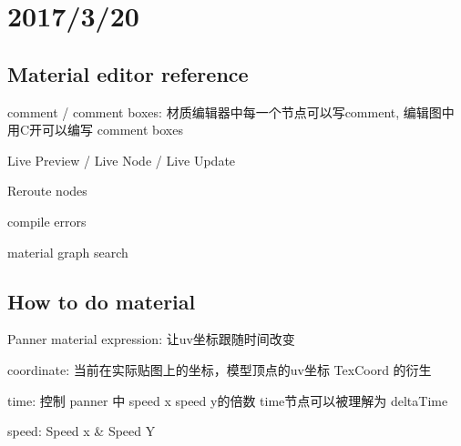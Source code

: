 \documentclass[12pt, a4paper]{article}
\begin{document}
    \section*{2017/3/20} 

    \subsection*{Material editor reference}
        comment / comment boxes: 材质编辑器中每一个节点可以写comment, 编辑图中用C开可以编写 comment boxes 

        Live Preview / Live Node / Live Update 

        Reroute nodes 

        compile errors

        material graph search 


    \subsection*{How to do material}
        Panner material expression: 让uv坐标跟随时间改变

        coordinate: 当前在实际贴图上的坐标，模型顶点的uv坐标 TexCoord 的衍生

        time: 控制 panner 中 speed x speed y的倍数 time节点可以被理解为 deltaTime

        speed: Speed x \& Speed Y
\end{document}
